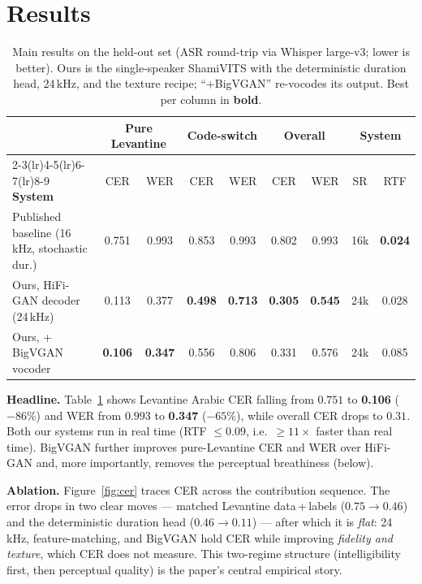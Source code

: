 \documentclass[10pt,twocolumn]{article}
\newcommand{\best}[1]{\textbf{#1}}
\begin{document}
\section{Results}
\label{sec:results}
\begin{table}[t]
\centering\small
\caption{Main results on the held-out set (ASR round-trip via Whisper large-v3; lower is
better). Ours is the single-speaker ShamiVITS with the deterministic duration head, 24\,kHz,
and the texture recipe; ``+BigVGAN'' re-vocodes its output. Best per column in \best{bold}.}
\label{tab:main}
\begin{tabular}{lcc cc cc cc}
\toprule
& \multicolumn{2}{c}{\textbf{Pure Levantine}} & \multicolumn{2}{c}{\textbf{Code-switch}}
& \multicolumn{2}{c}{\textbf{Overall}} & \multicolumn{2}{c}{\textbf{System}}\\
\cmidrule(lr){2-3}\cmidrule(lr){4-5}\cmidrule(lr){6-7}\cmidrule(lr){8-9}
\textbf{System} & CER & WER & CER & WER & CER & WER & SR & RTF\\
\midrule
Published baseline (16\,kHz, stochastic dur.) & 0.751 & 0.993 & 0.853 & 0.993 & 0.802 & 0.993 & 16k & \best{0.024}\\
Ours, HiFi-GAN decoder (24\,kHz)               & 0.113 & 0.377 & \best{0.498} & \best{0.713} & \best{0.305} & \best{0.545} & 24k & 0.028\\
Ours, + BigVGAN vocoder                        & \best{0.106} & \best{0.347} & 0.556 & 0.806 & 0.331 & 0.576 & 24k & 0.085\\
\bottomrule
\end{tabular}
\end{table}

\textbf{Headline.} Table~\ref{tab:main} shows Levantine Arabic CER falling from \(0.751\) to
\best{0.106} (\(-86\%\)) and WER from \(0.993\) to \best{0.347} (\(-65\%\)), while overall CER
drops to \(0.31\). Both our systems run in real time (RTF \(\leq\!0.09\), i.e.\
\(\geq\!11\times\) faster than real time). BigVGAN further improves pure-Levantine CER and WER
over HiFi-GAN and, more importantly, removes the perceptual breathiness (below).

\textbf{Ablation.} Figure~\ref{fig:cer} traces CER across the contribution sequence. The
error drops in two clear moves --- matched Levantine data\,+\,labels
(\(0.75\!\rightarrow\!0.46\)) and the deterministic duration head
(\(0.46\!\rightarrow\!0.11\)) --- after which it is \emph{flat}: 24\,kHz, feature-matching,
and BigVGAN hold CER while improving \emph{fidelity and texture}, which CER does not measure.
This two-regime structure (intelligibility first, then perceptual quality) is the paper's
central empirical story.
\end{document}
